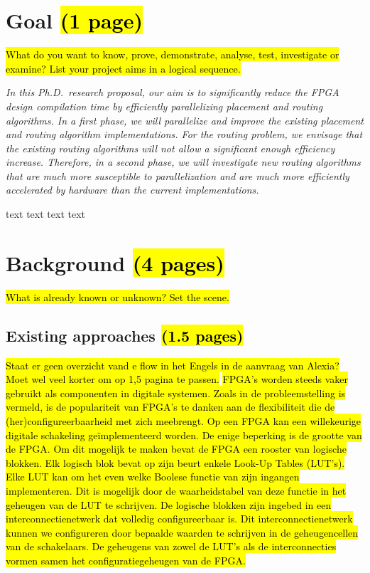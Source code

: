 \documentclass[a4paper,oneside,12pt]{article}
\begin{document}
\newpage

\section{Goal \hl{(1 page)}}
\hl{What do you want to know, prove, demonstrate, analyse, test, investigate or examine? List your project aims in a logical sequence.}


\emph{In this Ph.D.\ research proposal, our aim is to significantly reduce the FPGA design compilation time by efficiently parallelizing placement and routing algorithms. In a first phase, we will parallelize and improve the existing placement and routing algorithm implementations. For the routing problem, we envisage that the existing routing algorithms will not allow a significant enough efficiency increase. Therefore, in a second phase, we will investigate new routing algorithms that are much more susceptible to parallelization and are much more efficiently accelerated by hardware than the current implementations.}

text
text 
text
text


\newpage

\section{Background \hl{(4 pages)}}
\hl{What is already known or unknown? Set the scene.}

\subsection{Existing approaches \hl{(1.5 pages)}}

\hl{Staat er geen overzicht vand e flow in het Engels in de aanvraag van Alexia? Moet wel veel korter om op 1,5 pagina te passen.}
\hl{FPGA's worden steeds vaker gebruikt als componenten in digitale systemen. Zoals in de probleemstelling is vermeld, is de populariteit van FPGA's te danken aan de flexibiliteit die de (her)configureerbaarheid met zich meebrengt. Op een FPGA kan een willekeurige digitale schakeling ge\"implementeerd worden. De enige beperking is de grootte van de FPGA. Om dit mogelijk te maken bevat de FPGA een rooster van logische blokken. Elk logisch blok bevat op zijn beurt enkele Look-Up Tables (LUT's). Elke LUT kan om het even welke Boolese functie van zijn ingangen implementeren. Dit is mogelijk door de waarheidstabel van deze functie in het geheugen van de LUT te schrijven. De logische blokken zijn ingebed in een interconnectienetwerk dat volledig configureerbaar is. Dit interconnectienetwerk kunnen we configureren door bepaalde waarden te schrijven in de geheugencellen van de schakelaars. De geheugens van zowel de LUT's als de interconnecties vormen samen het configuratiegeheugen van de FPGA. }
\end{document}
